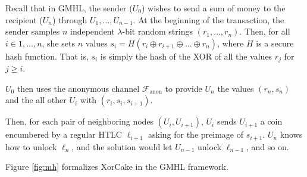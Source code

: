 \documentclass[USenglish,oneside,twocolumn]{article}
\begin{document}
Recall that in GMHL, the sender ($U_0$) wishes to send a sum of money to the recipient ($U_n$) through $U_1,\dots,U_{n-1}$. At the beginning of the transaction, the sender samples $n$ independent $\lambda$-bit random strings $(r_1,\dots,r_n)$. Then, for all $i\in1,\dots,n$, she sets $n$ values $s_i=H(r_i\oplus r_{i+1}\oplus\dots\oplus r_n)$, where $H$ is a secure hash function. That is, $s_i$ is simply the hash of the XOR of all the values $r_j$ for $j\geq i$.

$U_0$ then uses the anonymous channel $\mathcal{F}_\mathrm{anon}$ to provide $U_n$ the values $(r_n,s_n)$ and the all other $U_i$ with $(r_i,s_i,s_{i+1})$.

Then, for each pair of neighboring nodes $(U_i,U_{i+1})$, $U_i$ sends $U_{i+1}$ a coin encumbered by a regular HTLC $\ell_{i+1}$ asking for the preimage of $s_{i+1}$. $U_n$ knows how to unlock $\ell_n$, and the solution would let $U_{n-1}$ unlock $\ell_{n-1}$, and so on.

Figure \ref{fig:mh} formalizes XorCake in the GMHL framework.
\end{document}
